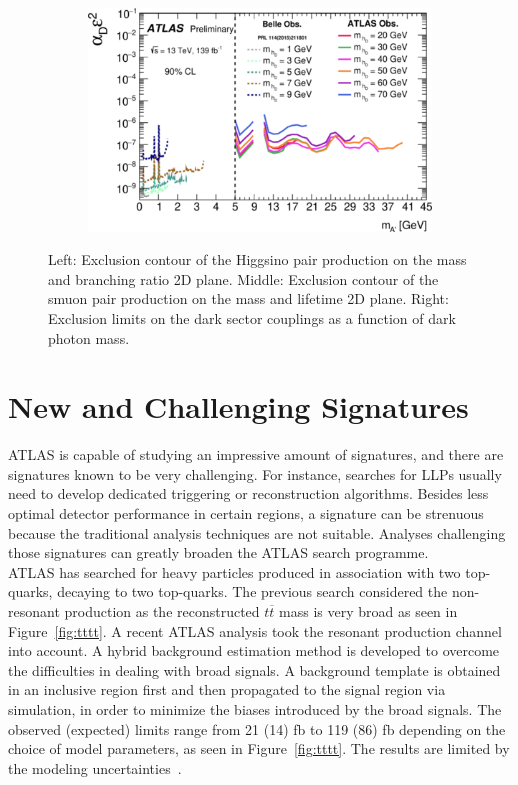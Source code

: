 \documentclass{moriond}
\begin{document}
\begin{figure}[htp]
\begin{subfigure}[b]{0.22\textwidth}
         \label{fig:micro}
     \end{subfigure}
     \begin{subfigure}[b]{0.28\textwidth}
         \centering
         \includegraphics[width=\textwidth]{dark}
         \label{fig:dark}
     \end{subfigure}
        \caption{Left: Exclusion contour of the Higgsino pair production on the mass and branching ratio 2D plane\protect\cite{bbyy}. Middle: Exclusion contour of the smuon pair production on the mass and lifetime 2D plane\protect\cite{micro}. Right: Exclusion limits on the dark sector couplings as a function of dark photon mass\protect\cite{dark}.}
        \label{fig:limits2}
\end{figure}

\section{New and Challenging Signatures}

ATLAS is capable of studying an impressive amount of signatures, and there are
signatures known to be very challenging. For instance, searches for LLPs
usually need to develop dedicated triggering or reconstruction algorithms.
Besides less optimal detector performance in certain regions, a signature can
be strenuous because the traditional analysis techniques are not suitable.
Analyses challenging those signatures can greatly broaden the ATLAS search
programme.\\

ATLAS has searched for heavy particles produced in association with two
top-quarks, decaying to two top-quarks. The previous search considered the
non-resonant production as the reconstructed $t\overline{t}$ mass is very broad
as seen in Figure~\ref{fig:tttt}. A recent ATLAS analysis
took the resonant production channel into account. A hybrid background
estimation method is developed to overcome the difficulties in dealing with
broad signals. A background template is obtained in an inclusive region first
and then propagated to the signal region via simulation, in order to minimize
the biases introduced by the broad signals. The observed (expected) limits
range from 21 (14) fb to 119 (86) fb depending on the choice of model
parameters, as seen in Figure~\ref{fig:tttt}. The
results are limited by the modeling uncertainties~\cite{tttt}.\\    
\end{document}
